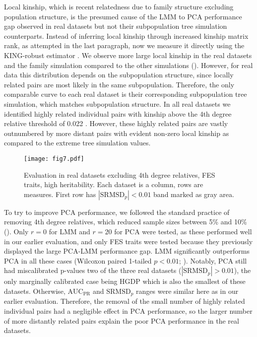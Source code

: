 \documentclass[9pt,lineno]{elife}
\newcommand{\rmsd}{\text{SRMSD}_p}
\newcommand{\auc}{\text{AUC}_\text{PR}}
\begin{document}
Local kinship, which is recent relatedness due to family structure excluding population structure, is the presumed cause of the LMM to PCA performance gap observed in real datasets but not their subpopulation tree simulation counterparts.
Instead of inferring local kinship through increased kinship matrix rank, as attempted in the last paragraph, now we measure it directly using the KING-robust estimator \citep{manichaikul_robust_2010}.
We observe more large local kinship in the real datasets and the family simulation compared to the other simulations ().
However, for real data this distribution depends on the subpopulation structure, since locally related pairs are most likely in the same subpopulation.
Therefore, the only comparable curve to each real dataset is their corresponding subpopulation tree simulation, which matches subpopulation structure.
In all real datasets we identified highly related individual pairs with kinship above the 4th degree relative threshold of 0.022 \citep{manichaikul_robust_2010, conomos_model-free_2016}.
However, these highly related pairs are vastly outnumbered by more distant pairs with evident non-zero local kinship as compared to the extreme tree simulation values.

\begin{figure}
  \texttt{[image: fig7.pdf]}
  \caption{
    Evaluation in real datasets excluding 4th degree relatives, FES traits, high heritability.
    Each dataset is a column, rows are measures.
    First row has $|\rmsd| < 0.01$ band marked as gray area.
  }
  \label{fig:king_cutoff}
  \label{figsupp:king_cutoff-h3}
\end{figure}

To try to improve PCA performance, we followed the standard practice of removing 4th degree relatives, which reduced sample sizes between 5\% and 10\% ().
Only $r=0$ for LMM and $r=20$ for PCA were tested, as these performed well in our earlier evaluation, and only FES traits were tested because they previously displayed the large PCA-LMM performance gap.
LMM significantly outperforms PCA in all these cases (Wilcoxon paired 1-tailed $p < 0.01$; ).
Notably, PCA still had miscalibrated p-values two of the three real datasets ($|\rmsd| > 0.01$), the only marginally calibrated case being HGDP which is also the smallest of these datasets.
Otherwise, $\auc$ and $\rmsd$ ranges were similar here as in our earlier evaluation.
Therefore, the removal of the small number of highly related individual pairs had a negligible effect in PCA performance, so the larger number of more distantly related pairs explain the poor PCA performance in the real datasets.
\end{document}
